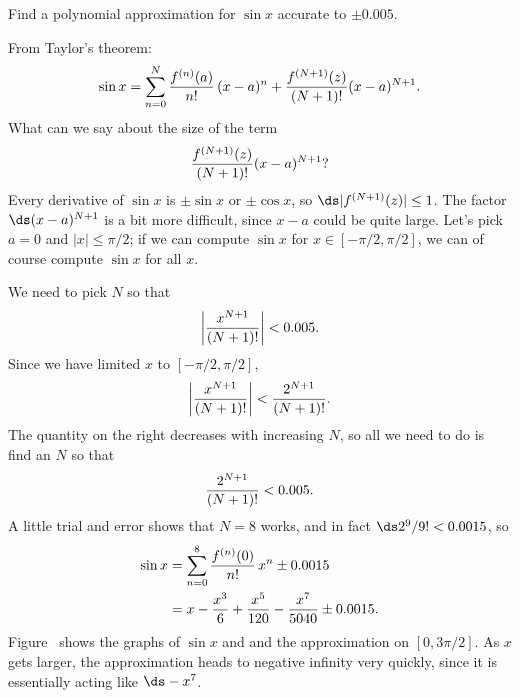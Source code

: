 \begin{example} Find a polynomial approximation for $\sin x$ accurate to $\pm
0.005$. 

From Taylor's theorem:
$$
  \sin x= \sum_{n=0}^N{f^{(n)}(a)\over n!}\,(x-a)^n + 
  {f^{(N+1)}(z)\over (N+1)!}(x-a)^{N+1}.
$$
What can we say about the size of the term
$${f^{(N+1)}(z)\over (N+1)!}(x-a)^{N+1}?$$
Every derivative of $\sin x$ is $\pm\sin x$ or $\pm\cos x$, so
$\ds |f^{(N+1)}(z)|\le 1$. The factor $\ds (x-a)^{N+1}$ is a bit more
difficult, since $x-a$ could be quite large. Let's pick $a=0$ and
$|x|\le\pi/2$; if we can compute $\sin x$ for $x\in[-\pi/2,\pi/2]$, we
can of course compute $\sin x$ for all $x$.

We need to pick $N$ so that 
$$\left|{x^{N+1}\over (N+1)!}\right|< 0.005.$$
Since we have limited $x$ to $[-\pi/2,\pi/2]$,
$$\left|{x^{N+1}\over (N+1)!}\right|<{2^{N+1}\over (N+1)!}.$$
The quantity on the right decreases with increasing $N$, so all we
need to do is find an $N$ so that 
$${2^{N+1}\over (N+1)!}<0.005.$$
A little trial and error shows that $N=8$ works, 
and in fact $\ds 2^{9}/9!<0.0015$, so 
\begin{align*}
  \sin x &=\sum_{n=0}^8{f^{(n)}(0)\over n!}\,x^n \pm 0.0015 \\
  &=x-{x^3\over 6}+{x^5\over 120}-{x^7\over 5040}\pm 0.0015. \\
\end{align*}
Figure~ shows the graphs of $\sin x$ and
and the approximation on $[0,3\pi/2]$. As $x$ gets larger, the
approximation heads to negative infinity very quickly, since it is
essentially acting like $\ds -x^7$.
\end{example}

